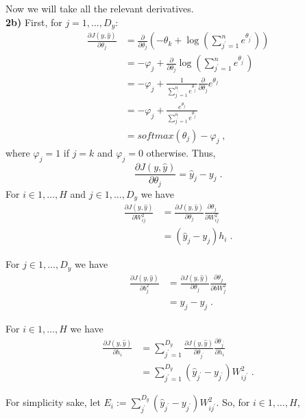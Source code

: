 \documentclass{article}
\begin{document}
Now we will take all the relevant derivatives.\\

\textbf{2b)} First, for $j = 1, \dots, D_{y}$:
\begin{align*}
\frac{\partial J(y,\hat{y})}{\partial \theta_j}  & = \frac{\partial}{\partial \theta_j}(- \theta_k + \log(\sum_{j^{\prime}=1}^{n} e^{\theta_{j^{\prime}}})) \\
& = - \varphi_j + \frac{\partial}{\partial \theta_j}\log(\sum_{j^{\prime}=1}^{n} e^{\theta_{j^{\prime}}}) \\
& = - \varphi_j + \frac{1}{\sum_{j^{\prime}=1}^{n} e^{\theta_{j^{\prime}}}}\frac{\partial}{\partial \theta_j} e^{\theta_{j}} \\
& = - \varphi_j + \frac{e^{\theta_{j}}}{\sum_{j^{\prime}=1}^{n} e^{\theta_{j^{\prime}}}}\\
& = softmax(\theta_{j}) - \varphi_j \; ,
\end{align*}
where $\varphi_j = 1$ if $j=k$ and $\varphi_j = 0$ otherwise. Thus,
\[
\frac{\partial J(y,\hat{y})}{\partial \theta_j} = \hat{y}_{j} - y_{j} \; .
\]
For $ i \in {1,\dots,H}$ and $j \in {1,\dots,D_{y}}$ we have
\begin{align*}
\frac{\partial J(y,\hat{y})}{\partial W^{2}_{ij}}  & = \frac{\partial J(y,\hat{y})}{\partial \theta_j} \frac{\partial\theta_j}{\partial W^{2}_{ij}} \\
& = (\hat{y}_{j} - y_{j})h_{i}\; .
\end{align*}

For $j \in {1,\dots,D_{y}}$ we have
\begin{align*}
\frac{\partial J(y,\hat{y})}{\partial b^{2}_{j}}  & = \frac{\partial J(y,\hat{y})}{\partial \theta_j} \frac{\partial\theta_j}{\partial bW^{2}_{j}} \\
& = \hat{y}_{j} - y_{j}\; .
\end{align*}

For $ i \in {1,\dots,H}$ we have
\begin{align*}
\frac{\partial J(y,\hat{y})}{\partial h_{i}}  & =\sum_{j^{\prime} =1}^{D_{y}} \frac{\partial J(y,\hat{y})}{\partial \theta_{j^{\prime}}} \frac{\partial\theta_{j^{\prime}}}{\partial h_{i}} \\
& = \sum_{j^{\prime}=1}^{D_{y}}(\hat{y}_{j^{\prime}} - y_{j^{\prime}})W^{2}_{ij^{\prime}}\; .
\end{align*}

For simplicity sake, let $E_{i} := \sum_{j^{\prime}}^{D_{y}}(\hat{y}_{j^{\prime}} - y_{j^{\prime}})W^{2}_{ij^{\prime}}$. So, for $ i \in {1,\dots,H}$, 
\end{document}
